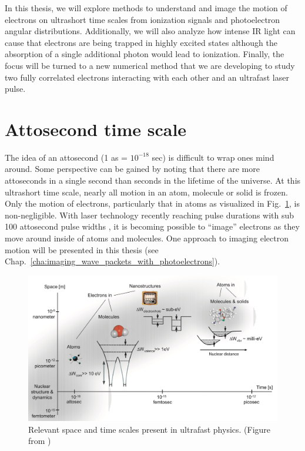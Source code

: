In this thesis, we will explore methods to understand and image the motion of electrons on ultrashort time scales from ionization signals and photoelectron angular distributions. Additionally, we will also analyze how intense IR light can cause that electrons are being trapped in highly excited states although the absorption of a single additional photon would lead to ionization. Finally, the focus will be turned to a new numerical method that we are developing to study two fully correlated electrons interacting with each other and an ultrafast laser pulse. 

\section{Attosecond time scale}
The idea of an attosecond (1 as = $10^{-18}$ sec) is difficult to wrap ones mind around. Some perspective can be gained by noting that there are more attoseconds in a single second than seconds in the lifetime of the universe. At this ultrashort time scale, nearly all motion in an atom, molecule or solid is frozen. Only the motion of electrons, particularly that in atoms as visualized in Fig.~\ref{fig:time_scales}, is non-negligible. With laser technology recently reaching pulse durations with sub 100 attosecond pulse widths \cite{zhao2012,chen2014}, it is becoming possible to ``image'' electrons as they move around inside of atoms and molecules. One approach to imaging electron motion will be presented in this thesis (see  Chap.~\ref{cha:imaging_wave_packets_with_photoelectrons}).

\begin{figure}[!ht]
\centering
\includegraphics[width=0.8\columnwidth]{figs/Intro/time_scales.png}
\caption{\label{fig:time_scales} Relevant space and time scales present in ultrafast physics. (Figure from \cite{krausz2009})
}
\end{figure}

